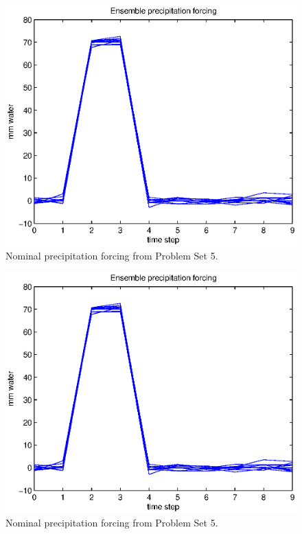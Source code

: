 \documentclass[letterpaper]{tufte-handout}
\begin{document}
    \begin{figure}
      \includegraphics[width=\textwidth]{1b}
      \caption{Nominal precipitation forcing from Problem Set 5.}
      \label{1b}
    \end{figure}
    \begin{figure}
      \includegraphics[width=\textwidth]{1b}
      \caption{Nominal precipitation forcing from Problem Set 5.}
      \label{1b}
    \end{figure}
\end{document}
